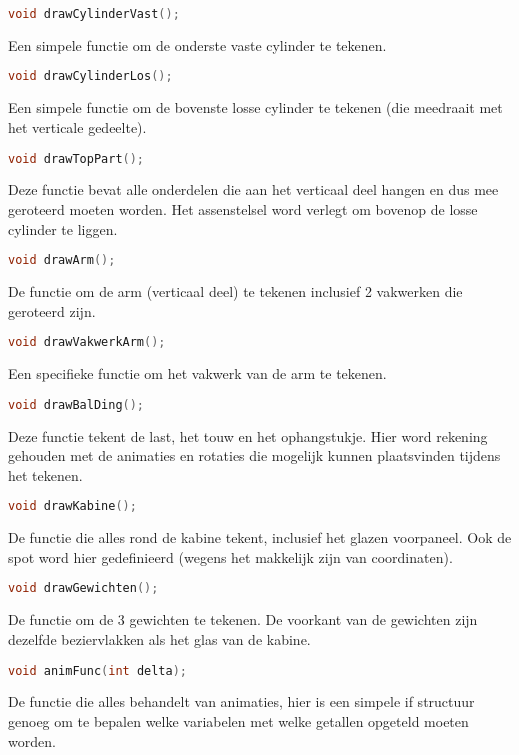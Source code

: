 \documentclass[a4paper, 12pt, one column]{article}
\begin{document}
\begin{lstlisting}[language=C]
    void drawCylinderVast();
\end{lstlisting}
Een simpele functie om de onderste vaste cylinder te tekenen.

\begin{lstlisting}[language=C]
    void drawCylinderLos();
\end{lstlisting}
Een simpele functie om de bovenste losse cylinder te tekenen (die meedraait met het 
verticale gedeelte).

\begin{lstlisting}[language=C]
    void drawTopPart();
\end{lstlisting}
Deze functie bevat alle onderdelen die aan het verticaal deel hangen en dus mee 
geroteerd moeten worden. Het assenstelsel word verlegt om bovenop de losse cylinder
te liggen.

\begin{lstlisting}[language=C]
    void drawArm();
\end{lstlisting}
De functie om de arm (verticaal deel) te tekenen inclusief 2 vakwerken die 
geroteerd zijn. 

\begin{lstlisting}[language=C]
    void drawVakwerkArm();
\end{lstlisting}
Een specifieke functie om het vakwerk van de arm te tekenen.

\begin{lstlisting}[language=C]
    void drawBalDing();
\end{lstlisting}
Deze functie tekent de last, het touw en het ophangstukje. Hier word rekening gehouden
met de animaties en rotaties die mogelijk kunnen plaatsvinden tijdens het tekenen.

\begin{lstlisting}[language=C]
    void drawKabine();
\end{lstlisting}
De functie die alles rond de kabine tekent, inclusief het glazen voorpaneel.
Ook de spot word hier gedefinieerd (wegens het makkelijk zijn van coordinaten).

\begin{lstlisting}[language=C]
    void drawGewichten();
\end{lstlisting}
De functie om de 3 gewichten te tekenen. De voorkant van de gewichten zijn dezelfde 
beziervlakken als het glas van de kabine.

\begin{lstlisting}[language=C]
    void animFunc(int delta);
\end{lstlisting}
De functie die alles behandelt van animaties, hier is een simpele if structuur genoeg
om te bepalen welke variabelen met welke getallen opgeteld moeten worden.


\end{document}
